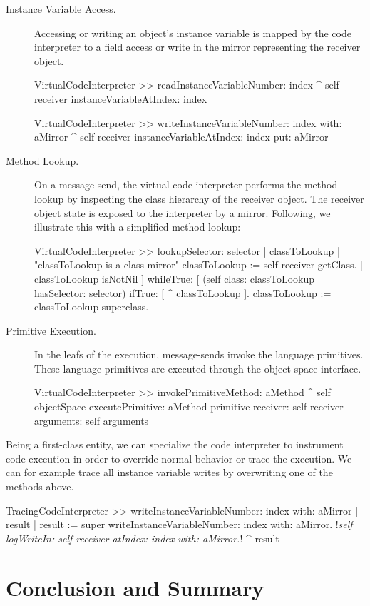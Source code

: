 \begin{description}
\item[Instance Variable Access.] Accessing or writing an object's instance variable is mapped by the code interpreter to a field access or write in the mirror representing the receiver object.

\begin{code}
VirtualCodeInterpreter >> readInstanceVariableNumber: index
    ^ self receiver instanceVariableAtIndex: index
    
VirtualCodeInterpreter >> writeInstanceVariableNumber: index with: aMirror
    ^ self receiver instanceVariableAtIndex: index put: aMirror
\end{code}

\item[Method Lookup.] On a message-send, the virtual code interpreter performs the method lookup by inspecting the class hierarchy of the receiver object. The receiver object state is exposed to the interpreter by a mirror. Following, we illustrate this with a simplified method lookup:

\begin{code}
VirtualCodeInterpreter >> lookupSelector: selector
    | classToLookup |
    "classToLookup is a class mirror"
    classToLookup := self receiver getClass.
    [ classToLookup isNotNil ] whileTrue: [
        (self class: classToLookup hasSelector: selector)
        	    ifTrue: [ ^ classToLookup ].
	classToLookup := classToLookup superclass.
    ]
\end{code}

\item[Primitive Execution.] In the leafs of the execution, message-sends invoke the language primitives. These language primitives are executed through the object space interface.

\begin{code}
VirtualCodeInterpreter >> invokePrimitiveMethod: aMethod
    ^ self objectSpace
         executePrimitive: aMethod primitive
         receiver: self receiver
         arguments: self arguments
\end{code}

\end{description}

Being a first-class entity, we can specialize the code interpreter to instrument code execution in order to override normal behavior or trace the execution. We can for example trace all instance variable writes by overwriting one of the methods above.

\begin{code}
TracingCodeInterpreter >> writeInstanceVariableNumber: index with: aMirror
    | result |
    result := super writeInstanceVariableNumber: index with: aMirror.
    !\emph{self logWriteIn: self receiver atIndex: index with: aMirror.}!
    ^ result
\end{code}

\section{Conclusion and Summary}

